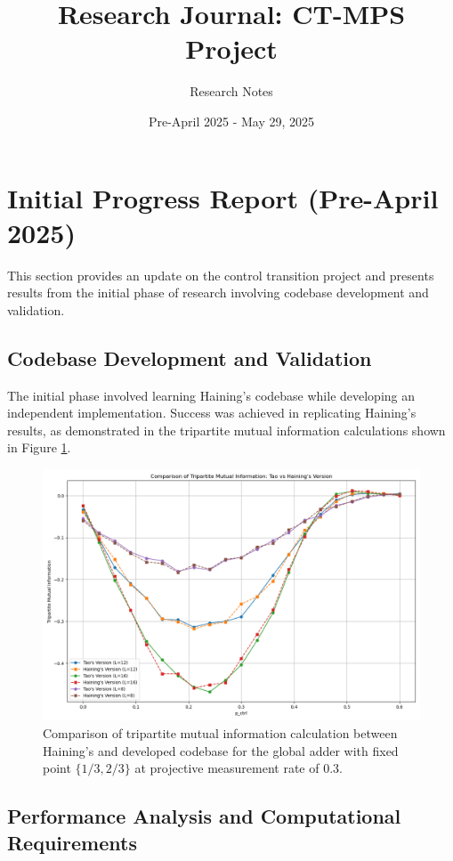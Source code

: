 \documentclass[11pt,a4paper]{article}
\title{Research Journal: CT-MPS Project}
\author{Research Notes}
\date{Pre-April 2025 - May 29, 2025}
\begin{document}
\maketitle

\section{Initial Progress Report (Pre-April 2025)}

This section provides an update on the control transition project and presents results from the initial phase of research involving codebase development and validation.

\subsection{Codebase Development and Validation}

The initial phase involved learning Haining's codebase while developing an independent implementation. Success was achieved in replicating Haining's results, as demonstrated in the tripartite mutual information calculations shown in Figure \ref{fig:tmi_comparison}.

\begin{figure}[H]
    \centering
    \includegraphics[width=0.8\linewidth]{tmi_comparison.png}
    \caption{Comparison of tripartite mutual information calculation between Haining's and developed codebase for the global adder with fixed point $\{1/3, 2/3\}$ at projective measurement rate of 0.3.}
    \label{fig:tmi_comparison}
\end{figure}

\subsection{Performance Analysis and Computational Requirements}
\end{document}
